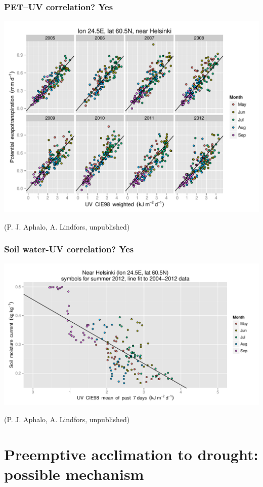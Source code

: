 \documentclass[10pt]{beamer}\usepackage[]{graphicx}\usepackage[]{xcolor}
\begin{document}
\begin{frame}
  \frametitle{PET--UV correlation? Yes}
  \includegraphics[width=0.8\linewidth]{figures/PET-CIE.pdf}

  (P. J. Aphalo, A. Lindfors, unpublished)
\end{frame}

\begin{frame}
  \frametitle{Soil water-UV correlation? Yes}
  \includegraphics[width=\linewidth]{figures/soil-CIEmean.pdf}

  (P. J. Aphalo, A. Lindfors, unpublished)
\end{frame}

\section[Preemptive acclimation to drought: possible mechanism]{Preemptive acclimation to drought:\\ possible mechanism}
\end{document}
